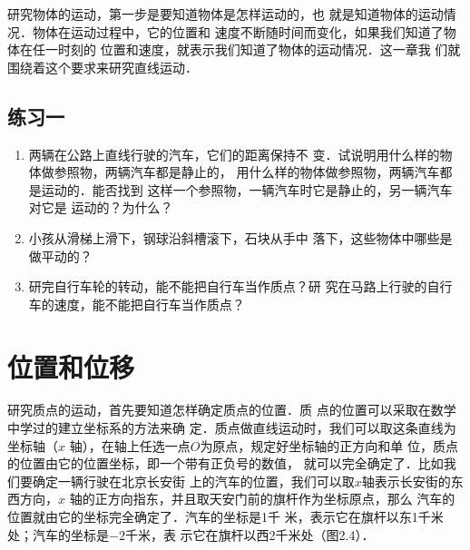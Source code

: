     研究物体的运动，第一步是要知道物体是怎样运动的，也
就是知道物体的运动情况．物体在运动过程中，它的位置和
速度不断随时间而变化，如果我们知道了物体在任一时刻的
位置和速度，就表示我们知道了物体的运动情况．这一章我
们就围绕着这个要求来研究直线运动．

 \subsection*{练习一}
\begin{enumerate}
\item 两辆在公路上直线行驶的汽车，它们的距离保持不
变．试说明用什么样的物体做参照物，两辆汽车都是静止的，
用什么样的物体做参照物，两辆汽车都是运动的．能否找到
这样一个参照物，一辆汽车时它是静止的，另一辆汽车对它是
运动的？为什么？

\item 小孩从滑梯上滑下，钢球沿斜槽滚下，石块从手中
落下，这些物体中哪些是做平动的？

\item 研完自行车轮的转动，能不能把自行车当作质点？研
究在马路上行驶的自行车的速度，能不能把自行车当作质点？
\end{enumerate}

\section{位置和位移}
    研究质点的运动，首先要知道怎样确定质点的位置．质
点的位置可以采取在数学中学过的建立坐标系的方法来确
定．质点做直线运动时，我们可以取这条直线为坐标轴（$x$
轴），在轴上任选一点$O$为原点，规定好坐标轴的正方向和单
位，质点的位置由它的位置坐标，即一个带有正负号的数值，
就可以完全确定了．比如我们要确定一辆行驶在北京长安街
上的汽车的位置，我们可以取$x$轴表示长安街的东西方向，$x$
轴的正方向指东，并且取天安门前的旗杆作为坐标原点，那么
汽车的位置就由它的坐标完全确定了．汽车的坐标是1千
米，表示它在旗杆以东1千米处；汽车的坐标是$-2$千米，表
示它在旗杆以西2千米处（图2.4）．
\begin{figure}[htp]
    \centering
    \caption{}
    \end{figure}

